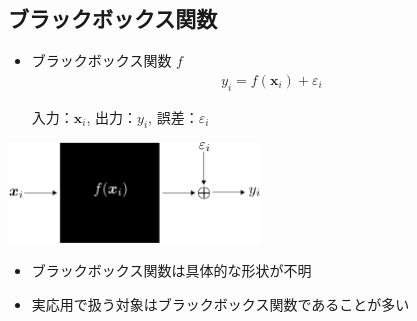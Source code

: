 \documentclass[dvipdfmx, 10.5pt]{beamer}
\begin{document}



\subsection{ブラックボックス関数}
\begin{frame}{\insertsubsection}
	\begin{itemize}
		\item ブラックボックス関数 $f$
		\begin{align*}
			y_i = f(\bm x_i) + \varepsilon_i
		\end{align*}
		\begin{center}
			入力：$\bm x_i$,\quad
			出力：$y_i$,\quad
			誤差：$\varepsilon_i$
		\end{center}
	\end{itemize}

	\vspace{5pt}
	\begin{center}
		\includegraphics[width=0.50\textwidth]{./Fig/blackbox.pdf}
	\end{center}
	\vspace{5pt}
	
	\begin{itemize}
		\item ブラックボックス関数は具体的な形状が不明
		\item 実応用で扱う対象はブラックボックス関数であることが多い
	\end{itemize}
\end{frame}

\end{document}

